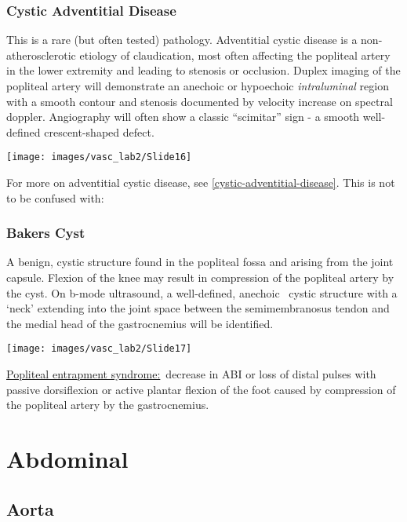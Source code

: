 \documentclass[
]{book}
\begin{document}
\hypertarget{cad}{%
\subsubsection{\texorpdfstring{\textbf{Cystic Adventitial Disease}}{Cystic Adventitial Disease}}\label{cad}}

This is a rare (but often tested) pathology. Adventitial cystic disease
is a non-atherosclerotic etiology of claudication, most often affecting
the popliteal artery in the lower extremity and leading to stenosis or
occlusion. Duplex imaging of the popliteal artery will demonstrate an
anechoic or hypoechoic \emph{intraluminal} region with a smooth contour and
stenosis documented by velocity increase on spectral doppler.
Angiography will often show a classic ``scimitar'' sign - a smooth
well-defined crescent-shaped defect.\citep{shaw2007, winn2015}

\texttt{[image: images/vasc\_lab2/Slide16]}

For more on adventitial cystic disease, see
\ref{cystic-adventitial-disease}. This is not to be confused with:

\hypertarget{bakers-cyst}{%
\subsubsection{Bakers Cyst}\label{bakers-cyst}}

A benign, cystic structure found in the popliteal fossa and arising from
the joint capsule. Flexion of the knee may result in compression of the
popliteal artery by the cyst. On b-mode ultrasound, a well-defined,
anechoic~ cystic structure with a `neck' extending into the joint space
between the semimembranosus tendon and the medial head of the
gastrocnemius will be identified.

\texttt{[image: images/vasc\_lab2/Slide17]}

\uline{Popliteal entrapment syndrome:}~decrease in ABI or loss of
distal pulses with passive dorsiflexion or active plantar flexion of the
foot caused by compression of the popliteal artery by the gastrocnemius.

\hypertarget{abdominal}{%
\section{Abdominal}\label{abdominal}}

\hypertarget{aorta}{%
\subsection{Aorta}\label{aorta}}
\end{document}
